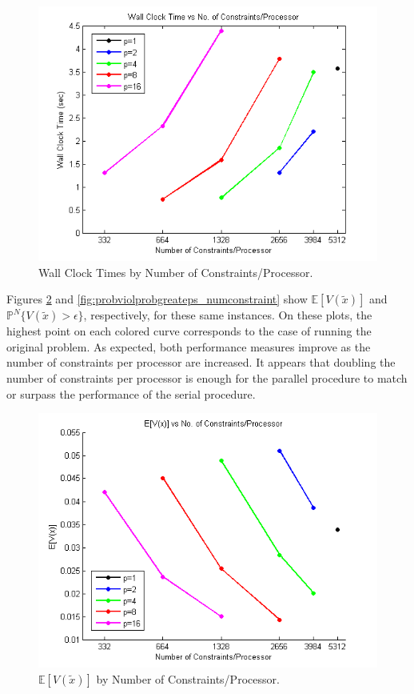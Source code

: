 \documentclass[12pt]{article}
\begin{document}
\begin{figure}[ht]
	\centering
		\includegraphics[scale=0.9]{../plot/figs/wct_numconstraint.png}
	\caption{Wall Clock Times by Number of Constraints/Processor.}
	\label{fig:wct_numconstraint}
\end{figure}

Figures \ref{fig:expviolprob_numconstraint} and \ref{fig:probviolprobgreateps_numconstraint} show $\mathbb{E}[V(\tilde{x})]$ and $\mathbb{P}^N\{V(\tilde{x}) > \epsilon \}$, respectively, for these same instances.
On these plots, the highest point on each colored curve corresponds to the case of running the original problem.
As expected, both performance measures improve as the number of constraints per processor are increased.
It appears that doubling the number of constraints per processor is enough for the parallel procedure to match or surpass the performance of the serial procedure.

\begin{figure}[ht]
	\centering
		\includegraphics[scale=0.9]{../plot/figs/expviolprob_numconstraint.png}
	\caption{$\mathbb{E}[V(\tilde{x})]$ by Number of Constraints/Processor.}
	\label{fig:expviolprob_numconstraint}
\end{figure}
\end{document}
